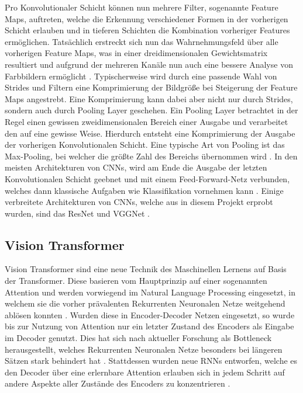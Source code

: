 \documentclass[twoside,a4paper]{IEEEtran}
\begin{document}
Pro Konvolutionaler Schicht können nun mehrere Filter, sogenannte Feature Maps, auftreten, welche die Erkennung verschiedener Formen in der vorherigen Schicht erlauben und in tieferen Schichten die Kombination vorheriger Features ermöglichen. Tatsächlich erstreckt sich nun das Wahrnehmungsfeld über alle vorherigen Feature Maps, was in einer dreidimensionalen Gewichtsmatrix resultiert und aufgrund der mehreren Kanäle nun auch eine bessere Analyse von Farbbildern ermöglicht \cite[S.364-365]{MACHINE_LEARNING}. Typischerweise wird durch eine passende Wahl von Strides und Filtern eine Komprimierung der Bildgröße bei Steigerung der Feature Maps angestrebt. Eine Komprimierung kann dabei aber nicht nur durch Strides, sondern auch durch Pooling Layer geschehen. Ein Pooling Layer betrachtet in der Regel einen gewissen zweidimensionalen Bereich einer Ausgabe und verarbeitet den auf eine gewisse Weise. Hierdurch entsteht eine Komprimierung der Ausgabe der vorherigen Konvolutionalen Schicht. Eine typische Art von Pooling ist das Max-Pooling, bei welcher die größte Zahl des Bereichs übernommen wird \cite[S.369-370]{MACHINE_LEARNING}. In den meisten Architekturen von CNNs, wird am Ende die Ausgabe der letzten Konvolutionalen Schicht geebnet und mit einem Feed-Forward-Netz verbunden, welches dann klassische Aufgaben wie Klassifikation vornehmen kann \cite[S.371]{MACHINE_LEARNING}. Einige verbreitete Architekturen von CNNs, welche aus in diesem Projekt erprobt wurden, sind das ResNet und VGGNet \cite[S.378-381]{MACHINE_LEARNING}.

\subsection{Vision Transformer} %

Vision Transformer sind eine neue Technik des Maschinellen Lernens auf Basis der Transformer. Diese basieren vom Hauptprinzip auf einer sogenannten Attention und werden vorwiegend im Natural Language Processing eingesetzt, in welchem sie die vorher prävalenten Rekurrenten Neuronalen Netze weitgehend ablösen konnten \cite{TRANSFORMERS}. Wurden diese in Encoder-Decoder Netzen eingesetzt, so wurde bis zur Nutzung von Attention nur ein letzter Zustand des Encoders als Eingabe im Decoder genutzt. Dies hat sich nach aktueller Forschung als Bottleneck herausgestellt, welches Rekurrenten Neuronalen Netze besonders bei längeren Sätzen stark behindert hat \cite[S.2]{TRANSFORMERS}. Stattdessen wurden neue RNNs entworfen, welche es den Decoder über eine erlernbare Attention erlauben sich in jedem Schritt auf andere Aspekte aller Zustände des Encoders zu konzentrieren \cite[S.4]{RNN_ATTENTION}.  
\end{document}
